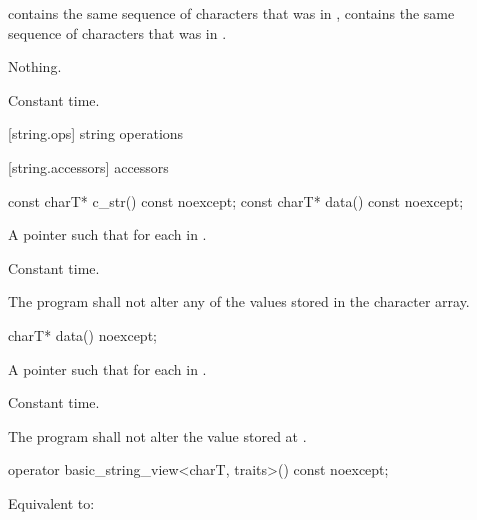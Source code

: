 \begin{itemdescr}
\pnum
\postconditions
{}
contains the same sequence of characters that was in ,
 contains the same sequence of characters that was in
.

\pnum
\throws Nothing.

\pnum
\complexity Constant time.
\end{itemdescr}

[string.ops]{ string operations}

[string.accessors]{ accessors}

%
%
\begin{itemdecl}
const charT* c_str() const noexcept;
const charT* data() const noexcept;
\end{itemdecl}

\begin{itemdescr}
\pnum
\returns A pointer  such that  for each
 in .

\pnum
\complexity Constant time.

\pnum
\requires
The program shall not alter any of the values stored in the character array.
\end{itemdescr}

%
\begin{itemdecl}
charT* data() noexcept;
\end{itemdecl}

\begin{itemdescr}
\pnum
\returns A pointer  such that  for each
 in .

\pnum
\complexity Constant time.

\pnum
\requires
The program shall not alter the value stored at .
\end{itemdescr}

%
\begin{itemdecl}
operator basic_string_view<charT, traits>() const noexcept;
\end{itemdecl}

\begin{itemdescr}
\pnum
\effects Equivalent to:
\end{itemdescr}

